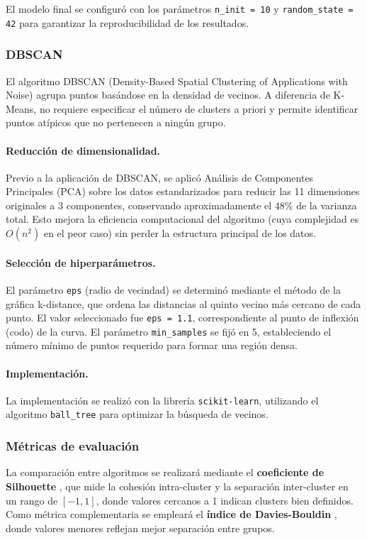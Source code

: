 El modelo final se configuró con los parámetros \texttt{n\_init = 10} y \texttt{random\_state = 42} para garantizar la reproducibilidad de los resultados.

\subsubsection{DBSCAN}

El algoritmo DBSCAN (Density-Based Spatial Clustering of Applications with Noise) agrupa puntos basándose en la densidad de vecinos. A diferencia de K-Means, no requiere especificar el número de clusters a priori y permite identificar puntos atípicos que no pertenecen a ningún grupo.

\paragraph{Reducción de dimensionalidad.}
Previo a la aplicación de DBSCAN, se aplicó Análisis de Componentes Principales (PCA) sobre los datos estandarizados para reducir las 11 dimensiones originales a 3 componentes, conservando aproximadamente el 48\% de la varianza total. Esto mejora la eficiencia computacional del algoritmo (cuya complejidad es \(O(n^2)\) en el peor caso) sin perder la estructura principal de los datos.

\paragraph{Selección de hiperparámetros.}
El parámetro \texttt{eps} (radio de vecindad) se determinó mediante el método de la gráfica k-distance, que ordena las distancias al quinto vecino más cercano de cada punto. El valor seleccionado fue \texttt{eps = 1.1}, correspondiente al punto de inflexión (codo) de la curva. El parámetro \texttt{min\_samples} se fijó en 5, estableciendo el número mínimo de puntos requerido para formar una región densa.

\paragraph{Implementación.}
La implementación se realizó con la librería \texttt{scikit-learn}, utilizando el algoritmo \texttt{ball\_tree} para optimizar la búsqueda de vecinos.

\subsubsection{Métricas de evaluación}

La comparación entre algoritmos se realizará mediante el \textbf{coeficiente de Silhouette} \cite{rousseeuw1987silhouettes}, que mide la cohesión intra-cluster y la separación inter-cluster en un rango de \([-1, 1]\), donde valores cercanos a 1 indican clusters bien definidos. Como métrica complementaria se empleará el \textbf{índice de Davies-Bouldin} \cite{davies1979cluster}, donde valores menores reflejan mejor separación entre grupos.